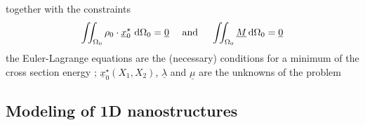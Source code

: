 \begin{frame}
  together with the constraints
  \begin{displaymath}
    \iint_{\Omega_0} \rho_0 \cdot \underline{x}_0^{\star} \, \dif \Omega_0 = \underline{0}
    \quad \text{ and } \quad
    \iint_{\Omega_0} \underline{M} \dif \Omega_0 = \underline{0}
  \end{displaymath}
  the Euler-Lagrange equations are the (necessary) conditions for a minimum of the cross section energy ; $\underline{x}_0^{\star}(X_1,X_2)$, $\underline{\lambda}$ and $\underline{\mu}$ are the unknowns of the problem
\end{frame}



\subsection{Modeling of 1D nanostructures}

